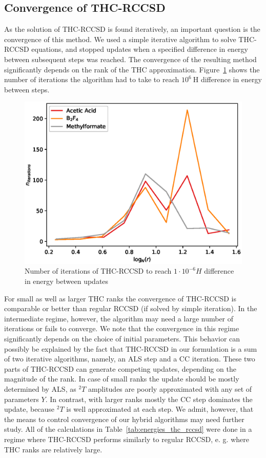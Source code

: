 \subsection{Convergence of THC-RCCSD}
As the solution of THC-RCCSD is found iteratively, an important question is 
the convergence of this method. We used a simple iterative algorithm to 
solve THC-RCCSD equations, and stopped updates when a specified difference in 
energy between subsequent steps was reached. The convergence of the resulting 
method significantly depends on the rank of the THC approximation. 
Figure~\ref{fig:cc_thc_convergence} shows the number of iterations the 
algorithm had to take to reach $10^{6} ~ \mathrm{H}$ difference 
in energy between steps.
%
\begin{figure}[tb]
\includegraphics[width=\columnwidth]{figures/thc_rccsd/niter_vs_logr}
\caption{Number of iterations of THC-RCCSD to reach $1 \cdot 10^{-6} H$ 
difference in energy between updates}
\label{fig:cc_thc_convergence}
\end{figure}
%
For small as well as larger THC ranks the convergence of THC-RCCSD is 
comparable or better than regular RCCSD (if solved by simple iteration). 
In the intermediate regime, however, the algorithm may need
a large number of iterations or fails to converge. We note that the 
convergence in this regime significantly depends on the choice of initial 
parameters. This behavior can possibly be explained by the fact that THC-RCCSD 
in our formulation is a sum of two iterative algorithms, namely, an ALS step 
and 
a CC iteration. These two parts of THC-RCCSD can generate competing updates, 
depending on the magnitude of the rank. In case of small ranks the update 
should be mostly determined by ALS, as ${}^{2}T$ amplitudes are poorly 
approximated with any set of parameters $Y$. In contrast, with larger ranks 
mostly the CC step dominates the update, because ${}^2T$ is well 
approximated at each step. We admit, however, that the means to control 
convergence of our hybrid algorithms may need further study. All of the 
calculations in Table~\ref{tab:energies_thc_rccsd} were done in a regime where 
THC-RCCSD performs similarly to regular RCCSD, e. g. where THC ranks are 
relatively large. 

